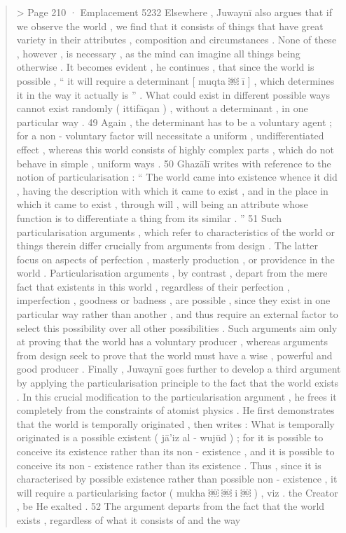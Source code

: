  \begin{quote}> Page 210 · Emplacement 5232
Elsewhere , Juwaynī also argues that if we observe the world , we find that it consists of things that have great variety in their attributes , composition and circumstances . None of these , however , is necessary , as the mind can imagine all things being otherwise . It becomes evident , he continues , that since the world is possible , “ it will require a determinant [ muqta ￼ ī ] , which determines it in the way it
actually is ” . What could exist in different possible ways cannot exist randomly ( ittifāqan ) , without a determinant , in one particular way . 49 Again , the determinant has to be a voluntary agent ; for a non - voluntary factor will necessitate a uniform , undifferentiated effect , whereas this world consists of highly complex parts , which do not behave in simple , uniform ways . 50 Ghazālī writes with reference to the notion of particularisation : “ The world came into existence whence it did , having the description with which it came to exist , and in the place in which it came to exist , through will , will being an attribute whose function is to differentiate a thing from its similar . ” 51 Such particularisation arguments , which refer to characteristics of the world or things therein differ crucially from arguments from design . The latter focus on aspects of perfection , masterly production , or providence in the world . Particularisation arguments , by contrast , depart from the mere fact that existents in this world , regardless of their perfection , imperfection , goodness or badness , are possible , since they exist in one particular way
rather than another , and thus require an external factor to select this possibility over all other possibilities . Such arguments aim only at proving that the world has a voluntary producer , whereas arguments from design seek to prove that the world must have a wise , powerful and good producer . Finally , Juwaynī goes further to develop a third argument by applying the particularisation principle to the fact that the world exists . In this crucial modification to the particularisation argument , he frees it completely from the constraints of atomist physics . He first demonstrates that the world is temporally originated , then writes : What is temporally originated is a possible existent ( jā’iz al - wujūd ) ; for it is possible to conceive its existence rather than its non - existence , and it is possible to conceive its non - existence rather than its existence . Thus , since it is characterised by possible existence rather than possible non - existence , it will require a particularising factor ( mukha ￼ ￼ i ￼ ) , viz . the Creator , be He exalted . 52 The argument departs from the fact that the world exists , regardless of what it consists of and the way

\end{quote}
